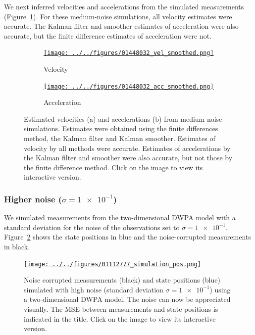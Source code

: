 \documentclass[12pt]{article}
\begin{document}
We next inferred velocities and accelerations from the simulated measurements
(Figure~\ref{fig:vel_acc_medium_noise}). For these medium-noise simulations,
all velocity estimates were accurate. The Kalman filter and smoother estimates
of acceleration were also accurate, but the finite difference estimates of
acceleration were not.

\begin{figure}

    \begin{subfigure}{\textwidth}
        \centering
        \href{http://www.gatsby.ucl.ac.uk/~rapela/fwg/lds_repo/inference/figures/01448032_vel_smoothed.html}{\texttt{[image: ../../figures/01448032\_vel\_smoothed.png]}}
        \caption{Velocity}
    \end{subfigure}

    \begin{subfigure}{\textwidth}
        \centering
        \href{http://www.gatsby.ucl.ac.uk/~rapela/fwg/lds_repo/inference/figures/01448032_acc_smoothed.html}{\texttt{[image: ../../figures/01448032\_acc\_smoothed.png]}}
        \caption{Acceleration}
    \end{subfigure}

    \caption{Estimated velocities (a) and accelerations (b) from medium-noise
    simulations. Estimates were obtained using the finite differences method,
    the Kalman filter and Kalman smoother.  Estimates of velocity by all
    methods were accurate. Estimates of accelerations by the Kalman filter and
    smoother were also accurate, but not those by the finite difference method.
    Click on the image to view its interactive version.}

    \label{fig:vel_acc_medium_noise}

\end{figure}

\subsubsection{Higher noise ($\sigma=\num{1e-1}$)}

We simulated measurements from the two-dimensional DWPA model with a standard
deviation for the noise of the observations set to $\sigma=\num{1e-1}$.
Figure~\ref{fig:simulations_high_noise} shows the state positions in blue and
the noise-corrupted measurements in black.

\begin{figure}

    \centering
    \href{http://www.gatsby.ucl.ac.uk/~rapela/fwg/lds_repo/inference/figures/01112777_simulation_pos.html}{\texttt{[image: ../../figures/01112777\_simulation\_pos.png]}}

    \caption{Noise corrupted measurements (black) and state positions (blue)
    simulated with high noise (standard deviation $\sigma=\num{1e-1}$) using a
    two-dimensional DWPA model. The noise can now be appreciated visually.  The
    MSE between measurements and state positions is indicated in the title.
    Click on the image to view its interactive version.}

    \label{fig:simulations_high_noise}

\end{figure}
\end{document}
